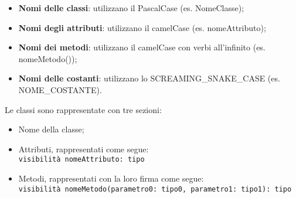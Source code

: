 \begin{itemize}
    \item \textbf{Nomi delle classi}: utilizzano il PascalCase (es. NomeClasse);
    \item \textbf{Nomi degli attributi}: utilizzano il camelCase (es. nomeAttributo);
    \item \textbf{Nomi dei metodi}: utilizzano il camelCase con verbi all'infinito (es. nomeMetodo());
    \item \textbf{Nomi delle costanti}: utilizzano lo SCREAMING\_SNAKE\_CASE (es. NOME\_COSTANTE).
\end{itemize}

Le classi sono rappresentate con tre sezioni:
\begin{itemize}
    \item Nome della classe;
    \item Attributi, rappresentati come segue:\\
    \texttt{visibilità nomeAttributo: tipo}
    \item Metodi, rappresentati con la loro firma come segue:\\
    \texttt{visibilità nomeMetodo(parametro0: tipo0, parametro1: tipo1): tipo}
\end{itemize}
